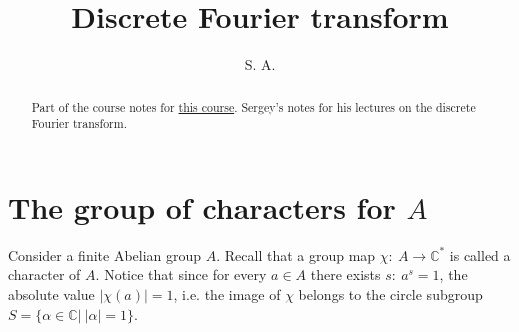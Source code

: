\documentclass[11pt]{amsart}
\theoremstyle{definition}
\newcommand{\C}{\mathbb{C}}
\begin{document}
\title{Discrete Fourier transform}
\begin{abstract}
  Part of the course notes for \href{2023-introduction-to-zeta-and-l-functions.pdf}{this course}.  Sergey's notes for his lectures on the discrete Fourier transform.
\end{abstract}
\author{S. A.}

\maketitle
\section{The group of characters for $A$}
Consider a finite Abelian group $A$. Recall that a group map $\chi:\ A\to \C^*$ is called a character of $A$. Notice that since for every $a\in A$ there exists $s:\ a^s=1$, the absolute value $|\chi(a)|=1$, i.e. the image of $\chi$ belongs to the circle subgroup $S=\{\alpha\in\C| \ |\alpha|=1\}$. 
\end{document}
